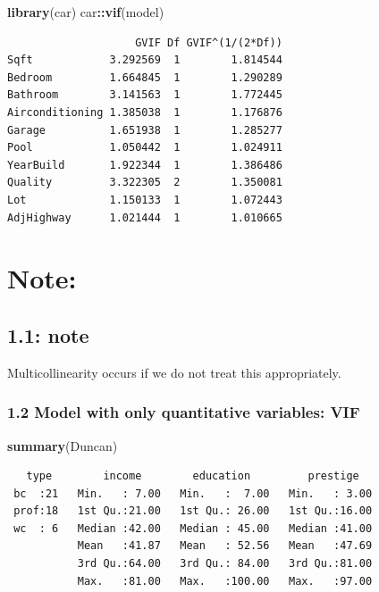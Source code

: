 \documentclass[]{article}
\newenvironment{Shaded}{\begin{snugshade}}{\end{snugshade}}
\newcommand{\KeywordTok}[1]{\textcolor[rgb]{0.13,0.29,0.53}{\textbf{#1}}}
\newcommand{\NormalTok}[1]{#1}
\newcommand{\OperatorTok}[1]{\textcolor[rgb]{0.81,0.36,0.00}{\textbf{#1}}}
\begin{document}
\begin{Shaded}
\begin{Highlighting}[]
\KeywordTok{library}\NormalTok{(car)}
\NormalTok{car}\OperatorTok{::}\KeywordTok{vif}\NormalTok{(model)}
\end{Highlighting}
\end{Shaded}

\begin{verbatim}
                    GVIF Df GVIF^(1/(2*Df))
Sqft            3.292569  1        1.814544
Bedroom         1.664845  1        1.290289
Bathroom        3.141563  1        1.772445
Airconditioning 1.385038  1        1.176876
Garage          1.651938  1        1.285277
Pool            1.050442  1        1.024911
YearBuild       1.922344  1        1.386486
Quality         3.322305  2        1.350081
Lot             1.150133  1        1.072443
AdjHighway      1.021444  1        1.010665
\end{verbatim}

\newpage

\hypertarget{note}{%
\section{Note:}\label{note}}

\hypertarget{note-1}{%
\subsection{1.1: note}\label{note-1}}

Multicollinearity occurs if we do not treat this appropriately.

\hypertarget{model-with-only-quantitative-variables-vif}{%
\subsubsection{1.2 Model with only quantitative variables:
VIF}\label{model-with-only-quantitative-variables-vif}}

\begin{Shaded}
\begin{Highlighting}[]
\KeywordTok{summary}\NormalTok{(Duncan)}
\end{Highlighting}
\end{Shaded}

\begin{verbatim}
   type        income        education         prestige    
 bc  :21   Min.   : 7.00   Min.   :  7.00   Min.   : 3.00  
 prof:18   1st Qu.:21.00   1st Qu.: 26.00   1st Qu.:16.00  
 wc  : 6   Median :42.00   Median : 45.00   Median :41.00  
           Mean   :41.87   Mean   : 52.56   Mean   :47.69  
           3rd Qu.:64.00   3rd Qu.: 84.00   3rd Qu.:81.00  
           Max.   :81.00   Max.   :100.00   Max.   :97.00  
\end{verbatim}
\end{document}
